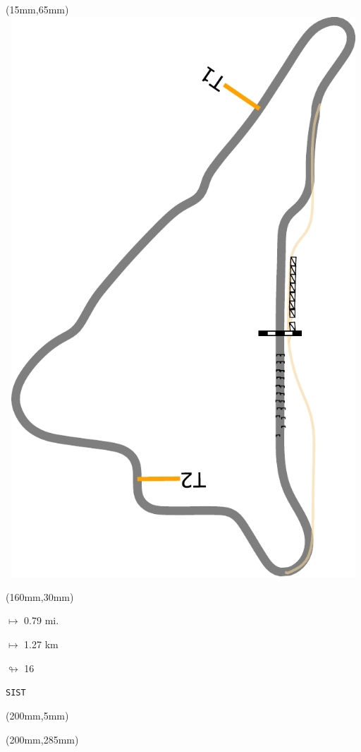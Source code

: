 \begin{textblock*}{185mm}(15mm,65mm)%
\centering
\mbox{\includegraphics[width=185mm,height=210mm,keepaspectratio]{PT/SIST.pdf}}
\end{textblock*}
\begin{textblock*}{40mm}(160mm,30mm)%
\Large
\par$\mapsto$ 0.79 mi.
\par$\mapsto$ 1.27 km
\par$\looparrowright$ 16
\par\hfill\tiny\tt SIST\\
\end{textblock*}
\begin{textblock*}{20mm}(200mm,5mm)%
\fbox{\thepage}
\label{SIST}
\end{textblock*}
\begin{textblock*}{20mm}(200mm,285mm)%
\fbox{\thepage}
\end{textblock*}

